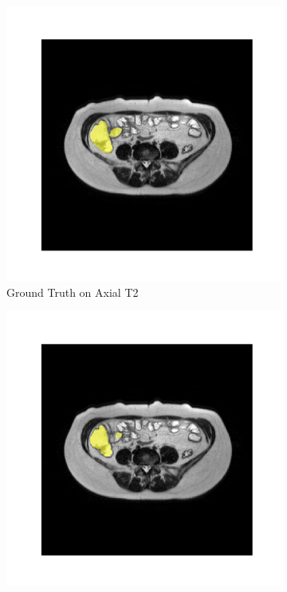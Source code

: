 \begin{figure}[htp]
    \centering
    \begin{subfigure}[b]{0.48\textwidth}
        \centering
        \includegraphics[width=\textwidth]{./figures/weak_mask_axial_gt.png}
        \caption{Ground Truth on Axial T2}
        \label{fig:gt-axial}
    \end{subfigure}
    \hfill
    \begin{subfigure}[b]{0.48\textwidth}
        \centering
        \includegraphics[width=\textwidth]{./figures/weak_mask_axial_medsam.png}

\end{subfigure}
\end{figure}
